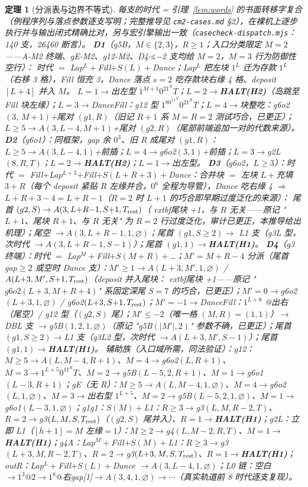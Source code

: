\documentclass[11pt]{ctexart}
\newtheorem{theorem}{定理}[section]
\theoremstyle{definition}
\begin{document}
\begin{theorem}[分派表与边界不等式]\label{thm:dispatch}
每支的时代 = 引理~\ref{lem:words} 的书面转移字复合（例程序列与落点参数逐支写明；完整推导见 \texttt{cm2-cases.md} §2），在裸机上逐步执行并与输出闭式精确比对，另与宏引擎输出一致（\texttt{casecheck-dispatch.mjs}：140 支，26460 断言）。
\textbf{D1}（g5B，$M\in\{2,3\}$，$R\ge1$；入口分类限定 $M{=}2$——A-M2 终端、gE-M2、g12-M2、D4-≤−2 支均给 $M{=}2$，$M{=}3$ 行为防御性空行）：
时代 $=$ Lap$^L\!+$Fill$+S(L)+$Dance；Lap$^L$ 把左块 $1^L$ 迁为存款 $1^L$（右移 3 格），Fill 恒充 3，Dance 落点 $s{=}2$ 吃存款块右缘 4 格、deposit $[L{+}4]$ 并入 $M$。
$L{=}1\to$出左型 $1^{M+1}0^21^RT$；$L{=}2\to$\textbf{HALT(H2)}（岛跳至 Fill 块左缘）；$L{=}3\to$DanceFill：g12 型 $1^80^11^M0^21^RT$；$L{=}4\to$块整吃：g6o2$(3,\,M{+}1)$+尾对 $(g1,R)$（旧记 $R{+}1$ 系 $M{=}R{=}2$ 测试巧合，已更正）；$L\ge5\to A(3,L{-}4,M{+}1)$+尾对 $(g2,R)$（尾部前端追加一对的代数来源）。
\textbf{D2}（g6o1）：同框架，gap 余 $0^3$、旧 R 成尾对 $(g1,R)$：$L\ge5\to A(3,L{-}4,1)$+前插；$L{=}4\to$g6o2$(3,1)$+前插；$L{=}3\to$g2L$(8,R,T)$；$L{=}2\to$\textbf{HALT(H2)}；$L{=}1\to$出左型。
\textbf{D3}（g6o2，$L\ge3$）：时代 $=$ Fill$+$Lap$^{L+3}$$+$Fill$+S(L{+}R{+}3)+$Dance：合并块 $=$ 左块 $L+$充填 $3+R$（每个 deposit 紧贴 $R$ 左缘并合，$0^6$ 全程为导管），Dance 吃右缘 4 $\Rightarrow$ $L{+}R{+}3{-}4=$\textbf{$L{+}R{-}1$}（$R{=}2$ 时 $L{+}1$ 的巧合即早期过度泛化的来源）：
尾首 $(g2,S)\to A(3,L{+}R{-}1,S{+}1,T_{\rm rest})$（	extbf{尾块 +1}，与 $R$ 无关——原记 "$L{+}1$、尾块 $R{+}1$、与 $R$ 无关" 为 $R{=}2$ 行过度泛化，审计已更正，本推导给出机理）；尾空 $\to A(3,L{+}R{-}1,1,\varnothing)$；尾首 $(g1,S{\ge}2)\to$ L1 支（g3L 型，次时代 $\to A(3,L{+}R{-}1,S{-}1)$）；尾首 $(g1,1)\to$\textbf{HALT(H1)}。
\textbf{D4}（g3 终端）：时代 $=$ Lap$^M+$Fill$+S(M{+}R)+$…；$M'{=}M{+}R{-}4$ 分派（尾首 gap$\ge2$ 或空时 Dance 支）：$M'\ge1\to A(L{+}3,M',1,\varnothing)$ / $A(L{+}3,M',S{+}1,T_{\rm rest})$（deposit 并入尾块：	extbf{尾块 +1}——原记 "$g6o2(L{+}3,M{+}R{+}4)$" 系固定深尾 $S{=}7$ 的巧合，已更正）；$M'{=}0\to$g6o2$(L{+}3,1,\varnothing)$ / g6o2$(L{+}3,S{+}1,T_{\rm rest})$；$M'{=}-1\to$DanceFill：$1^{L+8}$ @出右（尾空）/ g12 型（$(g2,S)$ 尾）；$M'\le-2$（唯一格 $(M,R){=}(1,1)$）$\to$DBL 支 $\to$g5B$(1,2,1,\varnothing)$（原记 "g5B$(|M'|,2)$" 参数不确，已更正）；尾首 $(g1,S{\ge}2)\to$L1 支（g3L2 型，次时代 $\to A(L{+}3,M',S{-}1)$）；尾首 $(g1,1)\to$\textbf{HALT(H1)}。
辅助族（入口域所需，同法验证）：g12：$M{\ge}5\to A(L,M{-}4,R{+}1)$、$M{=}4\to$g6o2$(L,R{+}1)$、$M{=}3\to 1^{L+5}0^11^RT$、$M{=}2\to$g5B$(L{-}5,2,R{+}1)$、$M{=}1\to$g6o1$(L{-}3,R{+}1)$；gE（无 R）：$M{\ge}5\to A(L,M{-}4,1,\varnothing)$、$M{=}4\to$g6o2$(L,1,\varnothing)$、$M{=}3\to$出右型 $1^{L+5}$、$M{=}2\to$g5B$(L{-}5,2,1,\varnothing)$、$M{=}1\to$g6o1$(L{-}3,1,\varnothing)$；g1g1：$S(M)+$L1：$R{\ge}3\to$g3$(L,M,R{-}2,T)$、$R{=}2\to$g3$(L,M,S,T_{\rm rest})$（$(g2,S)$ 尾并入）、$R{=}1\to$\textbf{HALT(H1)}；g2L：立即 L1（$[h{+}1]{=}M$ 左缘$=1$）：$M{\ge}2\to$g4$(L,M{-}2,R,T)$、$M{=}1\to$\textbf{HALT(H1)}；g4A：Lap$^M+$Fill$+S(M)+$L1：$R{\ge}3\to$g3$(L{+}3,M,R{-}2,T)$、$R{=}2\to$g3$(L{+}3,M,S,T_{\rm rest})$、$R{=}1\to$\textbf{HALT(H1)}；outR：Lap$^L+$Fill$+S(L)+$Dance $\to A(3,L{-}4,1,\varnothing)$；L0 链：空白 $\to1^3@2\to1^8@$右gap[1]$\to A(3,4,1,\varnothing)\to\cdots$（真实轨道前 8 时代逐支复现）。
$$
\end{theorem}
\end{document}
